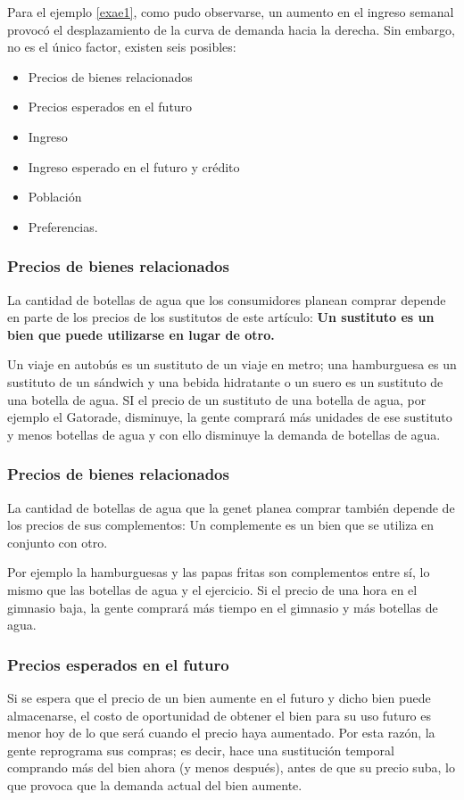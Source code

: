 Para el ejemplo \ref{exae1}, como pudo observarse, un aumento en el ingreso semanal provocó el desplazamiento de la curva de demanda hacia la derecha. Sin embargo, no es el único factor, existen seis posibles:
\begin{itemize}
    \item Precios de bienes relacionados
    \item Precios esperados en el futuro
    \item Ingreso
    \item Ingreso esperado en el futuro y crédito
    \item Población
    \item Preferencias.
\end{itemize}
\subsubsection{Precios de bienes relacionados} 
La cantidad de botellas de agua que los consumidores planean comprar depende en parte de los precios de los sustitutos de este artículo: \textbf{Un sustituto es un bien que puede utilizarse en lugar de otro.}

\begin{example}
    Un viaje en autobús es un sustituto de un viaje en metro; una hamburguesa es un sustituto de un sándwich y una bebida hidratante o un suero es un sustituto de una botella de agua. SI el precio de un sustituto de una botella de agua, por ejemplo el Gatorade, disminuye, la gente comprará más unidades de ese sustituto y menos botellas de agua y con ello disminuye la demanda de botellas de agua.
\end{example}

\subsubsection{Precios de bienes relacionados}

La cantidad de botellas de agua que la genet planea comprar también depende de los precios de sus complementos: Un complemente es un bien que se utiliza en conjunto con otro.

Por ejemplo la hamburguesas y las papas fritas son complementos entre sí, lo mismo que las botellas de agua y el ejercicio. Si el precio de una hora en el gimnasio baja, la gente comprará más tiempo en el gimnasio y más botellas de agua.

\subsubsection{Precios esperados en el futuro} 
Si se espera que el precio de un bien aumente en el futuro y dicho bien puede almacenarse, el costo de oportunidad de obtener el bien para su uso futuro es menor hoy de lo que será cuando el precio haya aumentado. Por esta razón, la gente reprograma sus compras; es decir, hace una sustitución temporal comprando más del bien ahora (y menos después), antes de que su precio suba, lo que provoca que la demanda actual del bien aumente.

